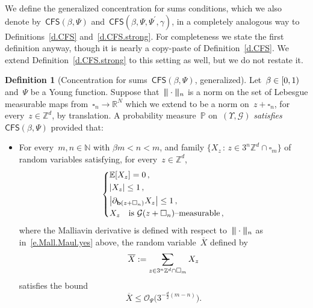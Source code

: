 \documentclass[11pt]{article} %
\makeatletter
\let\oldsquare\square %
\renewcommand{\square}{\oldsquare}
\numberwithin{equation}{section}
\theoremstyle{definition}
\newtheorem{definition}[theorem]{Definition}
\let\originalleft\left
\let\originalright\right
\renewcommand{\left}{\mathopen{}\mathclose\bgroup\originalleft}
\renewcommand{\right}{\aftergroup\egroup\originalright}
\newcommand{\vertiii}{\vert\kern-0.3ex\vert\kern-0.25ex\vert}
\newcommand*{\N}{\ensuremath{\mathbb{N}}}
\newcommand*{\R}{\ensuremath{\mathbb{R}}}
\newcommand*{\Zd}{\ensuremath{\mathbb{Z}^d}}
\renewcommand{\b}{\ensuremath{\mathbf{b}}}
\newcommand{\cu}{\square}
\renewcommand{\P}{\mathbb{P}}
\newcommand{\E}{\mathbb{E}}
\renewcommand{\O}{\mathcal{O}}
\newcommand{\avsum}{\mathop{\mathpalette\avsuminner\relax}\displaylimits}
\newcommand\avsuminner[2]{%
  {\sbox0{$\m@th#1\sum$}%
   \vphantom{\usebox0}%
   \ooalign{%
     \hidewidth
     \smash{\,\rule[.23em]{8.8pt}{1.1pt} \relax}%
     \hidewidth\cr
     $\m@th#1\sum$\cr
   }%
  }%
}
\newcommand{\CFS}{\mathsf{CFS}}
\makeatother
\begin{document}
We define the generalized concentration for sums conditions, which we also denote by~$\CFS(\beta,\Psi)$ and~$\CFS(\beta,\Psi,\Psi^\prime,\gamma)$, in a completely analogous way to Definitions~\ref{d.CFS} and~\ref{d.CFS.strong}. 
For completeness we state the first definition anyway, though it is nearly a copy-paste of Definition~\ref{d.CFS}. We extend Definition~\ref{d.CFS.strong} to this setting as well, but we do not restate it. 

\begin{definition}[Concentration for sums~$\CFS(\beta,\Psi)$, generalized]
\label{d.CFS.general}
Let~$\beta \in \left[0,1\right)$ and~$\Psi$ be a Young function. Suppose that~$\vertiii\cdot \vertiii_n$ is a norm on the set of Lebesgue measurable maps from~$\cu_n \to \R^N$ which we extend to be a norm on~$z+\cu_n$, for every~$z\in\Zd$, by translation. 
A probability measure~$\P$ on~$(\Upsilon,\mathcal{G})$ \emph{satisfies~$\CFS(\beta,\Psi)$} provided that: 
\begin{itemize}
\item
For every~$m,n\in\N$ with $\beta m < n<m$, and  family $\{ X_z \,:\, z\in 3^n\Zd\cap \cu_m\}$ of random variables satisfying, for every~$z\in\Zd$,
\begin{equation} 
\label{e.CFS.ass.gen}
\left\{
\begin{aligned}
& \E\left[ X_z \right]=0 \,, 
\\ & 
\left| X_z \right| \leq 1\,,
\\ &   
\left| \partial_{\b(z+\cu_n)} X_z\right| \leq 1 \,,
\\
& X_z \quad \mbox{is $\mathcal{G}(z+\cu_n)$--measurable} \,, \\
\end{aligned}
\right.
\end{equation}
where the Malliavin derivative is defined with respect to~$\vertiii \cdot \vertiii_{n}$ as in~\eqref{e.Mall.Maul.yes} above,
the random variable~$\overline{X}$ defined by
\begin{equation} 
\label{e.Z.norm.gen}
\overline{X}  :=  \avsum_{z\in 3^n\Zd\cap \cu_m}  X_z
\end{equation}
satisfies the bound
\begin{equation}
\label{e.CFS.gen}
\overline{X}
\leq
\O_{\Psi}
\bigl( 3^{-\frac d2(m-n)} \bigr).
\end{equation}
\end{itemize}
\end{definition}
\end{document}

